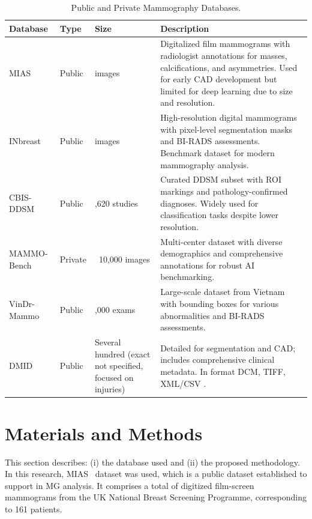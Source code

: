 \documentclass[runningheads]{llncs}
\begin{document}
\begin{table}[htbp]
\caption{Public and Private Mammography Databases.}\label{tab:mammography-datasets}
\scriptsize
\begin{tabularx}{\linewidth}{|>{\hsize=0.6\hsize}X|>{\hsize=0.6\hsize}X|>{\hsize=0.6\hsize}X|>{\hsize=2.2\hsize}X|}
\hline
\textbf{Database} & \textbf{Type} & \textbf{Size} & \textbf{Description} \\
\hline
MIAS~\cite{MIAS1994} & Public & 332 images & Digitalized film mammograms with radiologist annotations for masses, calcifications, and asymmetries. Used for early CAD development but limited for deep learning due to size and resolution. \\
\hline
INbreast~\cite{Moreira2012} & Public & 410 images & High-resolution digital mammograms with pixel-level segmentation masks and BI-RADS assessments. Benchmark dataset for modern mammography analysis. \\
\hline
CBIS-DDSM~\cite{SawyerLee2016} & Public & 2,620 studies & Curated DDSM subset with ROI markings and pathology-confirmed diagnoses. Widely used for classification tasks despite lower resolution. \\
\hline
MAMMO-Bench~\cite{MammoBench2023} & Private & ~10,000 images & Multi-center dataset with diverse demographics and comprehensive annotations for robust AI benchmarking. \\
\hline
VinDr-Mammo~\cite{Nguyen2022} & Public & 20,000 exams & Large-scale dataset from Vietnam with bounding boxes for various abnormalities and BI-RADS assessments. \\
\hline
DMID~\cite{oza_figshare,oza2024dmiddataset} & Public & Several hundred (exact not specified, focused on injuries) & Detailed for segmentation and CAD; includes comprehensive clinical metadata. In format DCM, TIFF, XML/CSV  . \\
\hline
\end{tabularx}
\end{table}

\newpage
\section{Materials and Methods}\label{sec:Methodology}
This section describes: (i) the database used and (ii) the proposed
methodology. In this research, \ac{MIAS}~\cite{MIAS1994} dataset was
used, which is a public dataset established to support in \ac{MG}
analysis. It comprises a total of  digitized film-screen
mammograms from the UK National Breast Screening Programme,
corresponding to 161 patients. 
\end{document}
